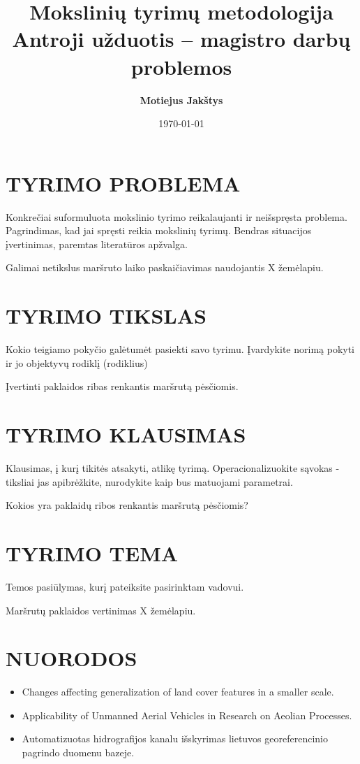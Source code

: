 \documentclass{article}
\title{Mokslinių tyrimų metodologija\\ \vspace{4mm} 
Antroji užduotis -- magistro darbų problemos}
\author{\bf Motiejus Jak\v{s}tys\\ \bf}
\date{\today}
\begin{document}
\maketitle

\section{TYRIMO PROBLEMA}

Konkrečiai suformuluota mokslinio tyrimo reikalaujanti ir neišspręsta problema.
Pagrindimas, kad jai spręsti reikia mokslinių tyrimų. Bendras situacijos
įvertinimas, paremtas literatūros apžvalga. 



Galimai netikslus maršruto laiko paskaičiavimas naudojantis X žemėlapiu.

\section{TYRIMO TIKSLAS}

Kokio teigiamo pokyčio galėtumėt pasiekti savo tyrimu. Įvardykite norimą pokyti
ir jo objektyvų rodiklį (rodiklius)

Įvertinti paklaidos ribas renkantis maršrutą pėsčiomis.

\section{TYRIMO KLAUSIMAS}

Klausimas, į kurį tikitės atsakyti, atlikę tyrimą. Operacionalizuokite sąvokas
- tiksliai jas apibrėžkite, nurodykite kaip bus matuojami parametrai.

Kokios yra paklaidų ribos renkantis maršrutą pėsčiomis?

\section{TYRIMO TEMA}

Temos pasiūlymas, kurį pateiksite pasirinktam vadovui. 

Maršrutų paklaidos vertinimas X žemėlapiu.

\section{NUORODOS}

\begin{itemize}
    \item Changes affecting generalization of land cover features in a smaller scale.
    \item Applicability of Unmanned Aerial Vehicles in Research on Aeolian Processes.
    \item Automatizuotas hidrografijos kanalu išskyrimas lietuvos georeferencinio pagrindo duomenu bazeje.
\end{itemize}
\end{document}
